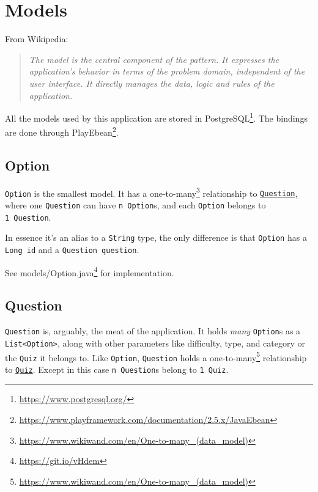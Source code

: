 \documentclass[english,a4paper,]{report}
\renewcommand{\href}[2]{#2\footnote{\url{#1}}}
\begin{document}
\section{Models}\label{models}

From Wikipedia:

\begin{quote}
\emph{The model is the central component of the pattern. It expresses
the application's behavior in terms of the problem domain, independent
of the user interface. It directly manages the data, logic and rules of
the application.}
\end{quote}

All the models used by this application are stored in
\href{https://www.postgresql.org/}{PostgreSQL}. The bindings are done
through
\href{https://www.playframework.com/documentation/2.5.x/JavaEbean}{PlayEbean}.

\subsection{Option}\label{option}

\texttt{Option} is the smallest model. It has a
\href{https://www.wikiwand.com/en/One-to-many_(data_model)}{one-to-many}
relationship to \protect\hyperlink{question}{\texttt{Question}}, where
one \texttt{Question} can have \texttt{n\ Option}s, and each
\texttt{Option} belongs to \texttt{1\ Question}.

In essence it's an alias to a \texttt{String} type, the only difference
is that \texttt{Option} has a \texttt{Long\ id} and a
\texttt{Question\ question}.

See \href{https://git.io/vHdem}{models/Option.java} for implementation.

\hypertarget{question}{\subsection{Question}\label{question}}

\texttt{Question} is, arguably, the meat of the application. It holds
\emph{many} \texttt{Option}s as a
\texttt{List\textless{}Option\textgreater{}}, along with other
parameters like difficulty, type, and category or the \texttt{Quiz} it
belongs to. Like \texttt{Option}, \texttt{Question} holds a
\href{https://www.wikiwand.com/en/One-to-many_(data_model)}{one-to-many}
relationship to \protect\hyperlink{quiz}{\texttt{Quiz}}. Except in this
case \texttt{n\ Question}s belong to \texttt{1\ Quiz}.
\end{document}
